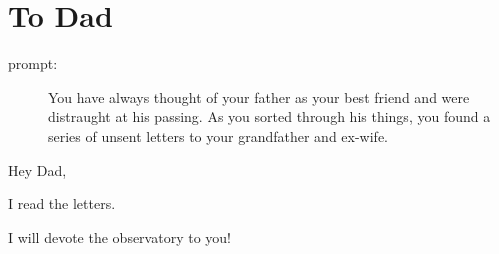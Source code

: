 \chapter{To Dad}

\begin{description}
\item[prompt:] You have always thought of your father as your best friend and were distraught at his passing. As you sorted through his things, you found a series of unsent letters to your grandfather and ex-wife.
\end{description}

Hey Dad,

I read the letters.

I will devote the observatory to you!
